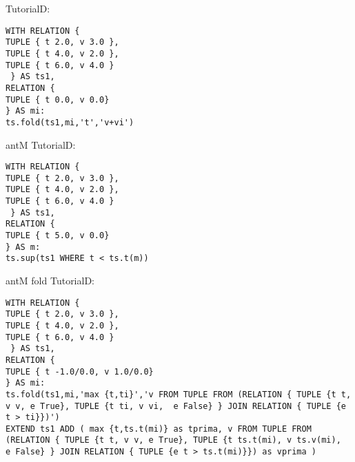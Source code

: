 TutorialD:
\begin{verbatim}
WITH RELATION {
TUPLE { t 2.0, v 3.0 },
TUPLE { t 4.0, v 2.0 },
TUPLE { t 6.0, v 4.0 }
 } AS ts1,
RELATION {
TUPLE { t 0.0, v 0.0}
} AS mi: 
ts.fold(ts1,mi,'t','v+vi')
\end{verbatim}

antM TutorialD:
\begin{verbatim}
WITH RELATION {
TUPLE { t 2.0, v 3.0 },
TUPLE { t 4.0, v 2.0 },
TUPLE { t 6.0, v 4.0 }
 } AS ts1,
RELATION {
TUPLE { t 5.0, v 0.0}
} AS m: 
ts.sup(ts1 WHERE t < ts.t(m))
\end{verbatim}

antM fold TutorialD:
\begin{verbatim}
WITH RELATION {
TUPLE { t 2.0, v 3.0 },
TUPLE { t 4.0, v 2.0 },
TUPLE { t 6.0, v 4.0 }
 } AS ts1,
RELATION {
TUPLE { t -1.0/0.0, v 1.0/0.0}
} AS mi: 
ts.fold(ts1,mi,'max {t,ti}','v FROM TUPLE FROM (RELATION { TUPLE {t t, v v, e True}, TUPLE {t ti, v vi,  e False} } JOIN RELATION { TUPLE {e t > ti}})')
EXTEND ts1 ADD ( max {t,ts.t(mi)} as tprima, v FROM TUPLE FROM (RELATION { TUPLE {t t, v v, e True}, TUPLE {t ts.t(mi), v ts.v(mi),  e False} } JOIN RELATION { TUPLE {e t > ts.t(mi)}}) as vprima )
\end{verbatim}











